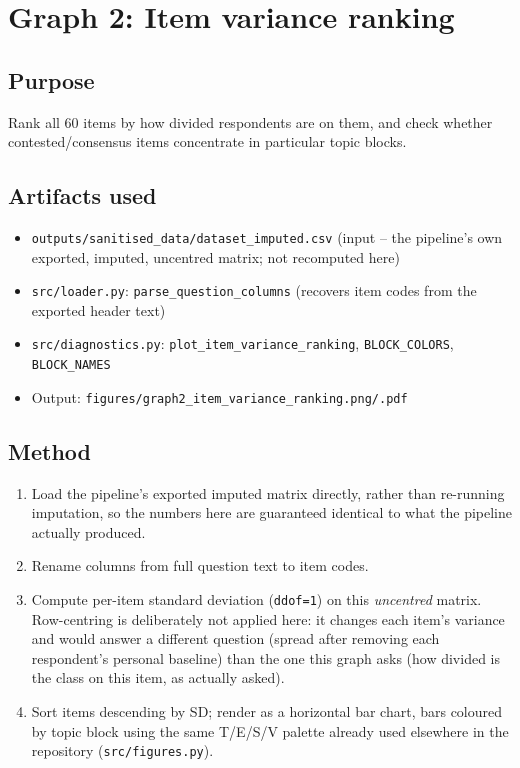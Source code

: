 \documentclass[11pt]{article}
\begin{document}
\section{Graph 2: Item variance ranking}

\subsection{Purpose}
Rank all 60 items by how divided respondents are on them, and check whether
contested/consensus items concentrate in particular topic blocks.

\subsection{Artifacts used}
\begin{itemize}
  \item \texttt{outputs/sanitised\_data/dataset\_imputed.csv} (input --
        the pipeline's own exported, imputed, uncentred matrix; not
        recomputed here)
  \item \texttt{src/loader.py}: \texttt{parse\_question\_columns} (recovers
        item codes from the exported header text)
  \item \texttt{src/diagnostics.py}: \texttt{plot\_item\_variance\_ranking},
        \texttt{BLOCK\_COLORS}, \texttt{BLOCK\_NAMES}
  \item Output: \texttt{figures/graph2\_item\_variance\_ranking.png/.pdf}
\end{itemize}

\subsection{Method}
\begin{enumerate}
  \item Load the pipeline's exported imputed matrix directly, rather than
        re-running imputation, so the numbers here are guaranteed identical
        to what the pipeline actually produced.
  \item Rename columns from full question text to item codes.
  \item Compute per-item standard deviation (\texttt{ddof=1}) on this
        \emph{uncentred} matrix. Row-centring is deliberately not applied
        here: it changes each item's variance and would answer a different
        question (spread after removing each respondent's personal baseline)
        than the one this graph asks (how divided is the class on this item,
        as actually asked).
  \item Sort items descending by SD; render as a horizontal bar chart, bars
        coloured by topic block using the same T/E/S/V palette already used
        elsewhere in the repository (\texttt{src/figures.py}).
\end{enumerate}
\end{document}
